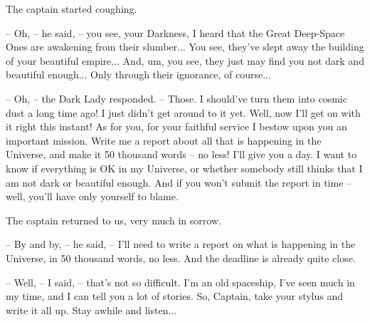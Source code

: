 \documentclass[ebook,twoside,final,openright]{memoir}
\begin{document}
The captain started coughing.\par
– Oh, – he said, – you see, your Darkness, I heard that the Great Deep-Space Ones are awakening from their slumber... You see, they’ve slept away the building of your beautiful empire... And, um, you see, they just may find you not dark and beautiful enough... Only through their ignorance, of course...\par
– Oh, – the Dark Lady responded. – Those. I should’ve turn them into cosmic dust a long time ago! I just didn’t get around to it yet. Well, now I’ll get on with it right this instant! As for you, for your faithful service I bestow upon you an important mission. Write me a report about all that is happening in the Universe, and make it 50 thousand words – no less! I’ll give you a day. I want to know if everything is OK in my Universe, or whether somebody still thinks that I am not dark or beautiful enough. And if you won’t submit the report in time – well, you’ll have only yourself to blame.\par
\par
The captain returned to us, very much in sorrow.\par
– By and by, – he said, – I’ll need to write a report on what is happening in the Universe, in 50 thousand words, no less. And the deadline is already quite close.\par
– Well, – I said, – that’s not so difficult. I'm an old spaceship, I’ve seen much in my time, and I can tell you a lot of stories. So, Captain, take your stylus and write it all up. Stay awhile and listen...
\end{document}
